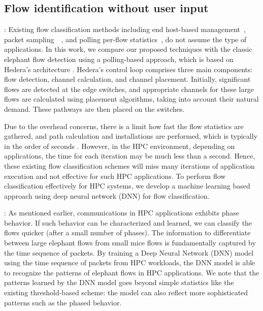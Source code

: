 \subsection{Flow identification without user input}


\vspace{0.08in}
:
Existing flow classification methods including end host-based
management~\cite{xu2015identifying},
packet sampling~\cite{suh2014opensample}~\cite{afek2015sampling},
and polling per-flow statistics~\cite{yang2020flow}, do not assume
the type of applications. In this work, we compare our proposed techniques with
the classic elephant flow detection using a polling-based approach,
which is based on Hedera's architecture \cite{al2010hedera}.
Hedera's control loop comprises
three main components: flow detection, channel calculation, and channel
placement. Initially, significant 
flows are detected at the edge switches, and appropriate channels for these 
large flows are calculated using placement algorithms, taking into account 
their natural demand. These pathways are then placed on the switches.

Due to the overhead concerns, there is a limit how fast the flow statistics
are gathered, and path calculation and installations are performed, which is typically
in the order of seconds \cite{al2010hedera}.
However, in the HPC environment, depending
on applications, the time for each iteration may be much less than a second.
Hence, these existing flow classification schemes will miss many iterations
of application execution and not effective for such HPC applications.
To perform flow classification effectively for HPC systems, we develop
a machine learning based approach using deep neural network (DNN)
for flow classification.

\vspace{0.08in}
:
As mentioned earlier, communications in HPC applications exhibits phase
behavior. If such behavior can be characterized and learned, we can classify
the flows quicker (after a small number of phases).
The information to differentiate between large elephant flows from
small mice flows is fundamentally captured by the time sequence of packets.
By training a Deep Neural Network (DNN) model using the time sequence of
packets from HPC workloads, the DNN model is able to recognize the
patterns of elephant flows in HPC applications. We note that the patterns
learned by the DNN model goes beyond simple statistics like
the existing threshold-based scheme: the model can also reflect more
sophisticated patterns such as the phased behavior. 


